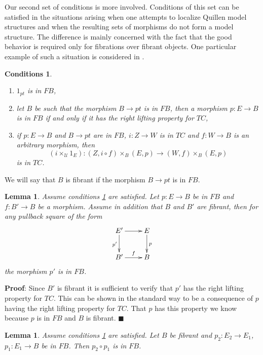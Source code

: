 \documentclass[12pt]{article}
\numberwithin{equation}{section}
\newenvironment{myproof}{{\bf Proof}:}{$\blacksquare$ \vskip 5mm }
\newtheorem{lemma}[proposition]{Lemma}
\newtheorem{cond}[proposition]{Conditions}
\newcommand{\sr}{\rightarrow}
\newcommand{\id}{1}            %
\newcommand{\U}{\mathcal{U}}
\begin{document}
Our second set of conditions is more involved. Conditions of this set can be
satisfied in the situations arising when one attempts to localize Quillen model
structures and when the resulting sets of morphisms do not form a model
structure. The difference is mainly concerned with the fact that the good
behavior is required only for fibrations over fibrant objects. One particular
example of such a situation is considered in \cite[Section 3.3]{SRF}.

%
\begin{cond}\label{2015.05.22.cond1}
%
\begin{enumerate}
\item $\id_{pt}$ is in $FB$,
\item let $B$ be such that the morphism $B\sr pt$ is in $FB$, then a morphism
  $p:E\sr B$ is in $FB$ if and only if it has the right lifting property for
  $TC$,
\item if $p:E\sr B$ and $B\sr pt$ are in $FB$, $i:Z\sr W$ is in $TC$ and
  $f:W\sr B$ is an arbitrary morphism, then
%
$$(i\times_\U \id_E):(Z,i\circ f)\times_B (E,p)\sr (W,f)\times_B (E,p)$$
%
is in $TC$.
%
\end{enumerate}
\end{cond}
%
We will say that $B$ is fibrant if the morphism $B\sr pt$ is in $FB$.
%
\begin{lemma}
  \label{2015.05.14.l2}
  Assume conditions \ref{2015.05.22.cond1} are satisfied.
Let $p:E\sr B$ be in $FB$ and $f:B'\sr B$ be a
morphism. Assume in addition that $B$ and $B'$ are fibrant, then for any
pullback square of the form
%
\[
\begin{xy}
          \xymatrix@C=2pc{ E' \ar[r] \ar[d]_{p'} & E \ar[d]^{p}\\ B'
            \ar[r]^-{f} & B }
\end{xy}
\]
%
the morphism $p'$ is in $FB$.
\end{lemma}
%
\begin{myproof}
Since $B'$ is fibrant it is sufficient to verify that $p'$ has the right
lifting property for $TC$. This can be shown in the standard way to be a
consequence of $p$ having the right lifting property for $TC$. That $p$ has
this property we know because $p$ is in $FB$ and $B$ is fibrant.
\end{myproof}
%
\begin{lemma}
  \label{2015.05.14.l4}
  Assume conditions \ref{2015.05.22.cond1} are satisfied.
  Let $B$ be fibrant and $p_2:E_2\sr E_1$, $p_1:E_1\sr B$
  be in $FB$. Then $p_2\circ p_1$ is in $FB$.
\end{lemma}
\end{document}
